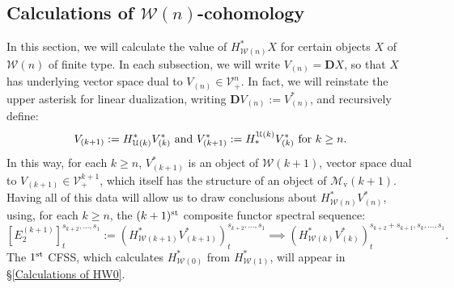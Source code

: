 \documentclass[11pt]{amsart} \renewcommand{\baselinestretch}{1.2}
\theoremstyle{plain}
\numberwithin{equation}{section} %
\theoremstyle{plain}
\numberwithin{equation}{chapter} %
\newcommand{\calU}{\mathcal{U}}
\newcommand{\calV}{\mathcal{V}}
\newcommand{\calw}{\mathcal{W}}
\newcommand{\calMv}{\mathcal{M}\dver}
\newcommand{\vect}[2]{\calV^{#1}_{#2}}
\newcommand{\E}[5]{[E^{#1}_{#2}#3]^{#4}_{#5}}
\newcommand{\dver}{_\mathrm{v}}
\newcommand{\dual}{\mathbf{D}}
\newcommand{\CFSS}{CFSS}
\newcommand{\SectionOrChapter}[1]{\section{\textbf{#1}}}
\begin{document}
\begin{Calculations of HWn}
\SectionOrChapter{Calculations of ${\calw(n)}$-cohomology}
\label{Calculations of HWn}
In this section, we will calculate the value of $H^*_{\calw(n)}X$ for certain  objects $X$ of $\calw(n)$ of finite type. In each subsection, we will write $V_{(n)}=\dual X$, so that $X$ has underlying vector space dual to $V_{{(n)}}\in\vect{n}{+}$. In fact, we will reinstate the upper asterisk for linear dualization, writing $\dual V_{(n)}:=V^*_{(n)}$, and recursively define:
\[V_{(k+1)}:=H^*_{\calU(k)}V^*_{(k)}\textup{ and }V^*_{(k+1)}:=H_*^{\calU(k)}V^*_{(k)}\textup{ for $k\geq n$}.\]
In this way, for each $k\geq n$, $V^*_{(k+1)}$ is an object of $\calw(k+1)$, vector space dual to $V_{(k+1)}\in\vect{k+1}{+}$, which itself has the structure of an object of $\calMv(k+1)$.
Having all of this data will allow us to draw conclusions about $H^*_{\calw(n)}V^*_{(n)}$, using, for each $k\geq n$, the $(k+1)^{\textup{st}}$ composite functor spectral sequence:
\[\E{(k+1)}{2}{}{s_{k+2},\ldots,s_1}{t}:=(H^*_{\calw(k+1)}V^*_{(k+1)})^{s_{k+2},\ldots,s_1}_{t}\implies (H^*_{\calw(k)}V^*_{(k)})^{s_{k+2}+s_{k+1},s_k,\ldots,s_1}_{t}.\]
The $1^{\textup{st}}$ \CFSS, which calculates $H^*_{\calw(0)}$ from $H^*_{\calw(1)}$, will appear in \S\ref{Calculations of HW0}.




\end{Calculations of HWn}
\end{document}
